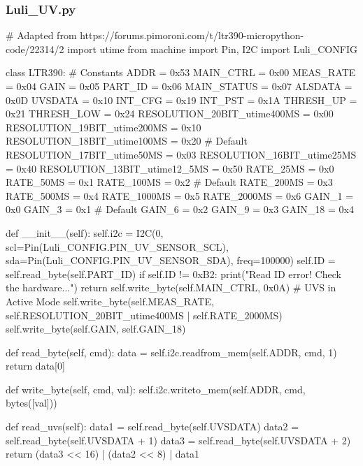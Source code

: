 \documentclass[12pt]{article} %
\begin{document}
\subsubsection{Luli\_UV.py}
\begin{pythoncode}[caption={Pico W UV Sensor Code}]
    # Adapted from  https://forums.pimoroni.com/t/ltr390-micropython-code/22314/2
    import utime
    from machine import Pin, I2C
    import Luli_CONFIG
    
    class LTR390:
        # Constants
        ADDR = 0x53
        MAIN_CTRL = 0x00
        MEAS_RATE = 0x04
        GAIN = 0x05
        PART_ID = 0x06
        MAIN_STATUS = 0x07
        ALSDATA = 0x0D
        UVSDATA = 0x10
        INT_CFG = 0x19
        INT_PST = 0x1A
        THRESH_UP = 0x21
        THRESH_LOW = 0x24
        RESOLUTION_20BIT_utime400MS = 0x00
        RESOLUTION_19BIT_utime200MS = 0x10
        RESOLUTION_18BIT_utime100MS = 0x20  # Default
        RESOLUTION_17BIT_utime50MS = 0x03
        RESOLUTION_16BIT_utime25MS = 0x40
        RESOLUTION_13BIT_utime12_5MS = 0x50
        RATE_25MS = 0x0
        RATE_50MS = 0x1
        RATE_100MS = 0x2  # Default
        RATE_200MS = 0x3
        RATE_500MS = 0x4
        RATE_1000MS = 0x5
        RATE_2000MS = 0x6
        GAIN_1 = 0x0
        GAIN_3 = 0x1  # Default
        GAIN_6 = 0x2
        GAIN_9 = 0x3
        GAIN_18 = 0x4
    
        def __init__(self):
            self.i2c = I2C(0, scl=Pin(Luli_CONFIG.PIN_UV_SENSOR_SCL), sda=Pin(Luli_CONFIG.PIN_UV_SENSOR_SDA), freq=100000)
            self.ID = self.read_byte(self.PART_ID)
            if self.ID != 0xB2:
                print("Read ID error! Check the hardware...")
                return
            self.write_byte(self.MAIN_CTRL, 0x0A)  # UVS in Active Mode
            self.write_byte(self.MEAS_RATE, self.RESOLUTION_20BIT_utime400MS | self.RATE_2000MS)
            self.write_byte(self.GAIN, self.GAIN_18)
    
        def read_byte(self, cmd):
            data = self.i2c.readfrom_mem(self.ADDR, cmd, 1)
            return data[0]
    
        def write_byte(self, cmd, val):
            self.i2c.writeto_mem(self.ADDR, cmd, bytes([val]))
    
        def read_uvs(self):
            data1 = self.read_byte(self.UVSDATA)
            data2 = self.read_byte(self.UVSDATA + 1)
            data3 = self.read_byte(self.UVSDATA + 2)
            return (data3 << 16) | (data2 << 8) | data1
        

\end{pythoncode}
\end{document}
